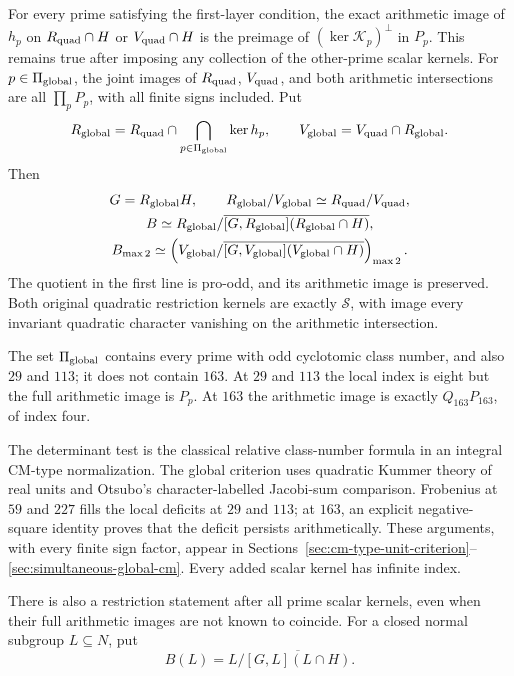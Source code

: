 \begin{theorem}\label{thm:main-cyclotomic-cm-normalization}
For every prime satisfying the first-layer condition, the exact
arithmetic image of \(h_p\) on \(R_{\rm quad}\cap H\) or
\(V_{\rm quad}\cap H\) is the preimage of
\((\ker\mathscr K_p)^\perp\) in \(P_p\). This remains true after
imposing any collection of the other-prime scalar kernels.
For \(p\in\Pi_{\rm global}\), the joint images of
\(R_{\rm quad}\), \(V_{\rm quad}\), and both arithmetic
intersections are all \(\prod_pP_p\), with all finite signs included.
Put
\[
 R_{\rm global}=R_{\rm quad}\cap
          \bigcap_{p\in\Pi_{\rm global}}\ker h_p,\qquad
 V_{\rm global}=V_{\rm quad}\cap R_{\rm global}.
\]
Then
\[
 \begin{gathered}
 G=R_{\rm global}H,\qquad
 R_{\rm global}/V_{\rm global}\simeq R_{\rm quad}/V_{\rm quad},\\
 B\simeq R_{\rm global}/
       \overline{[G,R_{\rm global}](R_{\rm global}\cap H)},\\
 B_{\max2}\simeq
 \left(V_{\rm global}/
       \overline{[G,V_{\rm global}](V_{\rm global}\cap H)}\right)_{\max2}.
 \end{gathered}
\]
The quotient in the first line is pro-odd, and its arithmetic image
is preserved. Both original quadratic restriction kernels are exactly
\(\mathcal S\), with image every invariant quadratic character
vanishing on the arithmetic intersection.

The set \(\Pi_{\rm global}\) contains every prime with odd cyclotomic
class number, and also \(29\) and \(113\); it does not contain \(163\).
At \(29\) and \(113\) the local index is eight but the full arithmetic
image is \(P_p\). At \(163\) the arithmetic image is exactly
\(Q_{163}P_{163}\), of index four.
\end{theorem}

The determinant test is the classical relative class-number formula
in an integral CM-type normalization. The global criterion uses
quadratic Kummer theory of real units and Otsubo's character-labelled
Jacobi-sum comparison. Frobenius at \(59\) and \(227\) fills the local
deficits at \(29\) and \(113\); at \(163\), an explicit negative-square
identity proves that the deficit persists arithmetically.
These arguments, with every finite sign factor, appear in
Sections~\ref{sec:cm-type-unit-criterion}--\ref{sec:simultaneous-global-cm}.
Every added scalar kernel has infinite index.

There is also a restriction statement after all prime scalar kernels,
even when their full arithmetic images are not known to coincide.
For a closed normal subgroup \(L\subseteq N\), put
\[
 B(L)=L/\overline{[G,L](L\cap H)}.
\]

